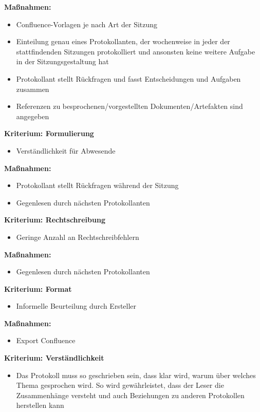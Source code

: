 \textbf{Maßnahmen: }
\begin{itemize}
\item	Confluence-Vorlagen je nach Art der Sitzung
\item	Einteilung genau eines Protokollanten, der wochenweise in jeder der stattfindenden Sitzungen protokolliert und ansonsten keine weitere Aufgabe in der Sitzungsgestaltung hat
\item	Protokollant stellt Rückfragen und fasst Entscheidungen und Aufgaben zusammen 
\item	Referenzen zu besprochenen/vorgestellten Dokumenten/Artefakten sind angegeben
\end{itemize}

\textbf{Kriterium: Formulierung}
\begin{itemize}
\item	Verständlichkeit für Abwesende
\end{itemize}

\textbf{Maßnahmen: }
\begin{itemize}
\item	Protokollant stellt Rückfragen während der Sitzung
\item	Gegenlesen durch nächsten Protokollanten
\end{itemize}

\textbf{Kriterium: Rechtschreibung}
\begin{itemize}
\item	Geringe Anzahl an Rechtschreibfehlern
\end{itemize}

\textbf{Maßnahmen: }
\begin{itemize}
\item	Gegenlesen durch nächsten Protokollanten
\end{itemize}

\textbf{Kriterium: Format}
\begin{itemize}
\item	Informelle Beurteilung durch Ersteller
\end{itemize}

\textbf{Maßnahmen: }
\begin{itemize}
\item	Export Confluence
\end{itemize}

\textbf{Kriterium: Verständlichkeit}
\begin{itemize}
\item	Das Protokoll muss so geschrieben sein, dass klar wird, warum über welches Thema gesprochen wird. So wird gewährleistet, dass der Leser die Zusammenhänge versteht und auch Beziehungen zu anderen Protokollen herstellen kann
\end{itemize}

